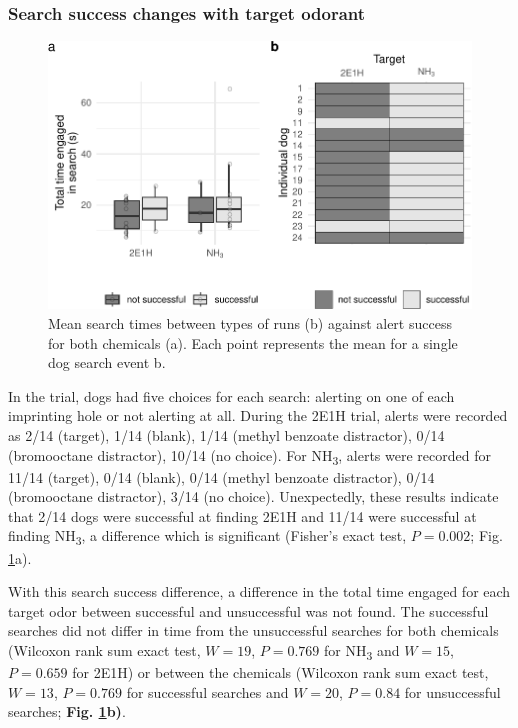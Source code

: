 \documentclass[
]{article}
\begin{document}
\hypertarget{search-success-changes-with-target-odorant}{%
\subsubsection{Search success changes with target odorant}\label{search-success-changes-with-target-odorant}}

\begin{figure}
\centering
\includegraphics{main-manuscript_files/figure-latex/search-times-1.pdf}
\caption{\label{fig:search-times}Mean search times between types of runs (b) against alert success for both chemicals (a). Each point represents the mean for a single dog search event b.}
\end{figure}

In the trial, dogs had five choices for each search: alerting on one of each imprinting hole or not alerting at all. During the 2E1H trial, alerts were recorded as 2/14 (target), 1/14 (blank), 1/14 (methyl benzoate distractor), 0/14 (bromooctane distractor), 10/14 (no choice). For NH\textsubscript{3}, alerts were recorded for 11/14 (target), 0/14 (blank), 0/14 (methyl benzoate distractor), 0/14 (bromooctane distractor), 3/14 (no choice). Unexpectedly, these results indicate that 2/14 dogs were successful at finding 2E1H and 11/14 were successful at finding NH\textsubscript{3}, a difference which is significant (Fisher's exact test, \(P = 0.002\); Fig. \ref{fig:search-times}a).

With this search success difference, a difference in the total time engaged for each target odor between successful and unsuccessful was not found. The successful searches did not differ in time from the unsuccessful searches for both chemicals (Wilcoxon rank sum exact test, \(W = 19\), \(P = 0.769\) for NH\textsubscript{3} and \(W = 15\), \(P = 0.659\) for 2E1H) or between the chemicals (Wilcoxon rank sum exact test, \(W = 13\), \(P = 0.769\) for successful searches and \(W = 20\), \(P = 0.84\) for unsuccessful searches; \textbf{Fig. \ref{fig:search-times}b)}.
\end{document}
